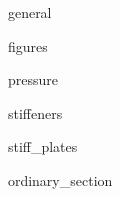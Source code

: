 ^^^general

^^^figures

^^^pressure

^^^stiffeners

^^^stiff_plates

^^^ordinary_section

\clearpage
\restoregeometry